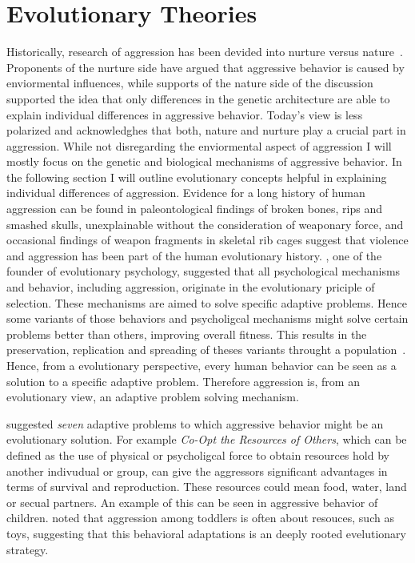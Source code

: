 \section{Evolutionary Theories}
\label{sec:evolutionary_theories}

Historically, research of aggression has been devided into nurture versus nature~\cite{Archer2009}. 
Proponents of the nurture side have argued that aggressive behavior is caused by enviormental influences, while supports of the nature side of the discussion supported the idea that only differences in the genetic architecture are able to explain individual differences in aggressive behavior.
Today's view is less polarized and acknowledghes that both, nature and nurture play a crucial part in aggression.
While not disregarding the enviormental aspect of aggression I will mostly focus on the genetic and biological mechanisms of aggressive behavior.
In the following section I will outline evolutionary concepts helpful in explaining individual differences of aggression. 
\vfill
Evidence for a long history of human aggression can be found in  paleontological findings of broken bones, rips and smashed skulls, unexplainable without the consideration of weaponary force, and occasional findings of weapon fragments in skeletal rib cages suggest that violence and aggression has been part of the human evolutionary history. 
\citet{Buss1997}, one of the founder of evolutionary psychology, suggested that all psychological mechanisms and behavior, including aggression, originate in the evolutionary priciple of selection.  
These mechanisms are aimed to solve specific adaptive problems.
Hence some variants of those behaviors and psycholigcal mechanisms might solve certain problems better than others, improving overall fitness.
This results in the preservation, replication and spreading of theses variants throught a population~\cite{Buss1997}.
Hence, from a evolutionary perspective, every human behavior can be seen as a solution to a specific adaptive problem.
Therefore aggression is, from an evolutionary view, an adaptive problem solving mechanism.

\citet{Buss1997} suggested \textit{seven} adaptive problems to which aggressive behavior might be an evolutionary solution.
For example \textit{Co-Opt the Resources of Others}, which can be defined as the use of physical or psycholigcal force to obtain resources hold by another indivudual or group, can give the aggressors significant advantages in terms of survival and reproduction.
These resources could mean food, water, land or secual partners.
An example of this can be seen in aggressive behavior of children.
\citet{Campbell1995} noted that aggression among toddlers is often about resouces, such as toys, suggesting that this behavioral adaptations is an deeply rooted evelutionary strategy.

